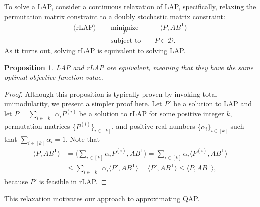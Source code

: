 \documentclass[11pt]{article}
\newcommand{\T}{^{\ensuremath{\mathsf{T}}}}           %
\newtheorem{prop}{Proposition}
\providecommand{\mc}[1]{\mathcal{#1}}
\providecommand{\mb}[1]{\boldsymbol{#1}}
\newcommand{\Real}{\mathbb{R}}
\begin{document}
To solve a LAP, consider a continuous relaxation of LAP, specifically, relaxing the permutation matrix constraint to a doubly stochastic matrix constraint:
\begin{subequations} \label{eq:rLAP}
\begin{align}
		\text{(rLAP) } \quad &\underset{P}{\text{minimize}}  &&-\langle P, AB\T \rangle \\
		&\text{subject to } && P \in \mc{D}.
\end{align}
\end{subequations}
As it turns out, solving rLAP is equivalent to solving LAP.
\begin{prop}
	LAP and rLAP are equivalent, meaning that they have the same optimal objective function value.
\end{prop}
\begin{proof}
	Although this proposition is typically proven by invoking total unimodularity, we present a simpler proof here.	Let $P'$ be a solution to LAP and let $P = \sum_{i\in[k]} \alpha_i P^{(i)}$ be a solution to rLAP for some positive integer $k$, permutation matrices $\{P^{(i)}\}_{i \in [k]}$, and positive real numbers $\{\alpha_i\}_{i \in[k]}$ such that $\sum_{i \in [k]} \alpha_i=1$.  Note that 
	\begin{align*}
	\langle P,AB\T \rangle &= \langle  \sum_{i\in[k]} \alpha_i P^{(i)}, AB\T \rangle=  \sum_{i\in[k]} \alpha_i \langle  P^{(i)}, AB\T \rangle	 \\
	&\leq \sum_{i\in[k]} \alpha_i \langle P', AB\T  \rangle = \langle P', AB\T \rangle \leq \langle P, AB\T \rangle,
	\end{align*}
	because $P'$ is feasible in rLAP.
	\end{proof}
This relaxation motivates our approach to approximating QAP.
\end{document}
